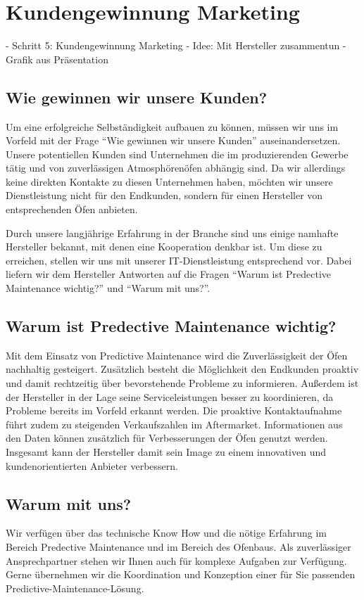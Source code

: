 \section{Kundengewinnung Marketing}

- Schritt 5: Kundengewinnung Marketing
	- Idee: Mit Hersteller zusammentun
	- Grafik aus Präsentation
	
\subsection{Wie gewinnen wir unsere Kunden?}

Um eine erfolgreiche Selbständigkeit aufbauen zu können, müssen wir uns im Vorfeld mit der Frage “Wie gewinnen wir unsere Kunden” auseinandersetzen.
Unsere potentiellen Kunden sind Unternehmen die im produzierenden Gewerbe tätig und von zuverlässigen Atmosphörenöfen abhängig sind. Da wir allerdings keine direkten Kontakte zu diesen Unternehmen haben, möchten wir unsere Dienstleistung nicht für den Endkunden, sondern für einen Hersteller von entsprechenden Öfen anbieten.

Durch unsere langjährige Erfahrung in der Branche sind uns einige namhafte Hersteller bekannt, mit denen eine Kooperation denkbar ist. Um diese zu erreichen, stellen wir uns mit unserer IT-Dienstleistung entsprechend vor. Dabei liefern wir dem Hersteller Antworten auf die Fragen “Warum ist Predective Maintenance wichtig?” und “Warum mit uns?”.

\subsection{Warum ist Predective Maintenance wichtig?}
Mit dem Einsatz von Predictive Maintenance wird die Zuverlässigkeit der Öfen nachhaltig gesteigert. Zusätzlich besteht die Möglichkeit den Endkunden proaktiv und damit rechtzeitig über bevorstehende Probleme zu informieren. Außerdem ist der Hersteller in der Lage seine Serviceleistungen besser zu koordinieren, da Probleme bereits im Vorfeld erkannt werden. Die proaktive Kontaktaufnahme führt zudem zu steigenden Verkaufszahlen im Aftermarket.  Informationen aus den Daten können zusätzlich für Verbesserungen der Öfen genutzt werden.
Insgesamt kann der Hersteller damit sein Image zu einem innovativen und kundenorientierten Anbieter verbessern.

\subsection{Warum mit uns?}
Wir verfügen über das technische Know How und die nötige Erfahrung im Bereich Predective Maintenance und im Bereich des Ofenbaus. Als zuverlässiger Ansprechpartner stehen wir Ihnen auch für komplexe Aufgaben zur Verfügung. Gerne übernehmen wir die Koordination und Konzeption einer für Sie passenden Predictive-Maintenance-Lösung.
	